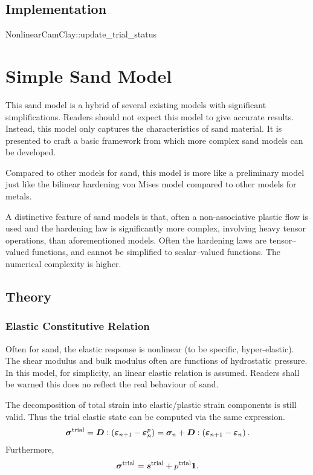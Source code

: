 \subsection{Implementation}
\begin{cppcode}
NonlinearCamClay::update_trial_status
\end{cppcode}
\section{Simple Sand Model}
This sand model is a hybrid of several existing models with significant simplifications. Readers should not expect this model to give accurate results. Instead, this model only captures the characteristics of sand material. It is presented to craft a basic framework from which more complex sand models can be developed.

Compared to other models for sand, this model is more like a preliminary model just like the bilinear hardening von Mises model compared to other models for metals.

A distinctive feature of sand models is that, often a non-associative plastic flow is used and the hardening law is significantly more complex, involving heavy tensor operations, than aforementioned models. Often the hardening laws are tensor--valued functions, and cannot be simplified to scalar--valued functions. The numerical complexity is higher.
\subsection{Theory}
\subsubsection{Elastic Constitutive Relation}
Often for sand, the elastic response is nonlinear (to be specific, hyper-elastic). The shear modulus and bulk modulus often are functions of hydrostatic pressure. In this model, for simplicity, an linear elastic relation is assumed. Readers shall be warned this does no reflect the real behaviour of sand.

The decomposition of total strain into elastic/plastic strain components is still valid. Thus the trial elastic state can be computed via the same expression.
\begin{gather}\label{eq:ss_tsigma}
\bm{\sigma}^\text{trial}=\bm{D}:\left(\bm{\varepsilon}_{n+1}-\bm{\varepsilon}^p_n\right)=\bm{\sigma}_n+\bm{D}:\left(\bm{\varepsilon}_{n+1}-\bm{\varepsilon}_n\right).
\end{gather}
Furthermore,
\begin{gather}
\bm{\sigma}^\text{trial}=\bm{s}^\text{trial}+p^\text{trial}\bm{1}.
\end{gather}
